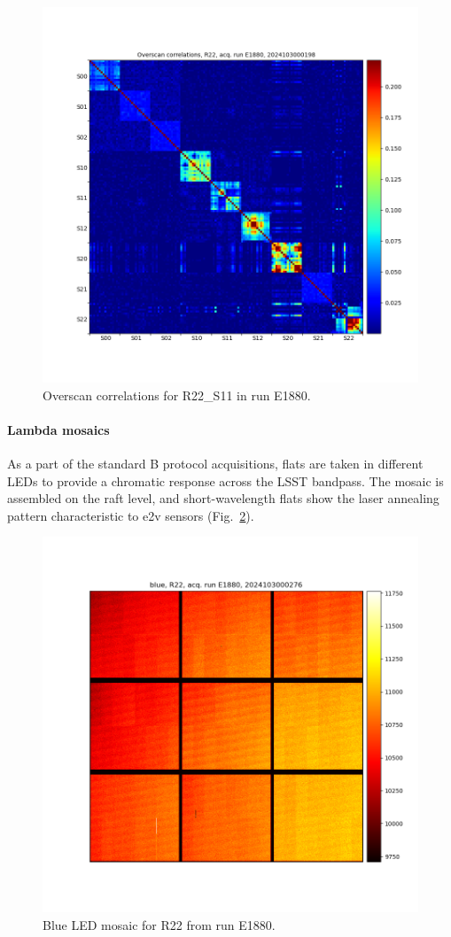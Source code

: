 \begin{figure}[ht]
    \centering
    \includegraphics[width=0.8\linewidth]{figures/ReferenceFigures/overscan_correlation_plot_LSSTCam_R22_S00_u_lsstccs_eo_raft_amp_correlations_E1880_w_2024_35_20241101T015955Z.png}
    \caption{Overscan correlations for R22\_S11 in run E1880.}
    \label{fig:ref:overscanCorrelations}
\end{figure}
\clearpage
\paragraph{Lambda mosaics}

As a part of the standard B protocol acquisitions, flats are taken in different LEDs to provide a chromatic response across the LSST bandpass. The mosaic is assembled on the raft level, and short-wavelength flats show the laser annealing pattern characteristic to e2v sensors (Fig.~\ref{fig:ref:blueLambda}).

\begin{figure}[ht]
    \centering
    \includegraphics[width=0.8\linewidth]{figures/ReferenceFigures/eoRaftMosaic_LSSTCam_blue_MC_C_20241030_000276_R22_S00_u_lsstccs_eo_raft_lambda_mosaics_E1880_w_2024_35_20241101T020341Z.png}
    \caption{Blue LED mosaic for R22 from run E1880.}
    \label{fig:ref:blueLambda}
\end{figure}
\clearpage
